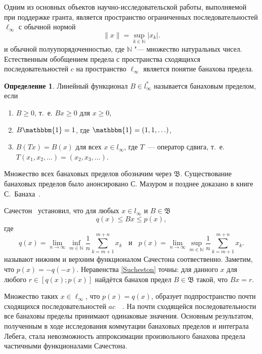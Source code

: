 \documentclass[a4paper,openbib]{report}
\renewcommand{\geq}{\geqslant} %
\theoremstyle{definition}
\newtheorem{definition}[lemma]{Определение}
\begin{document}

\setcounter{page}{2}

Одним из основных объектов научно-исследовательской работы, выполняемой при поддержке гранта,
является пространство ограниченных последовательностей $\ell_\infty$ с обычной нормой
\begin{equation*}
	\|x\| = \sup_{k\in\mathbb{N}} |x_k|
	.
\end{equation*}
и обычной полуупорядоченностью, где $\mathbb{N}$ "--- множество натуральных чисел.
Естественным обобщением предела с пространства сходящихся последовательностей $c$ на пространство $\ell_\infty$
является понятие банахова предела.


\begin{definition}
	Линейный функционал $B\in l_\infty^*$ называется банаховым пределом,
	если
	\begin{enumerate}
		\item
			$B\geq0$, т.~е. $Bx \geq 0$ для $x \geq 0$,
		\item
			$B\mathbbm{1}=1$, где $\mathbbm{1} =(1,1,\ldots)$,
		\item
			$B(Tx)=B(x)$ для всех $x\in l_\infty$, где $T$~---
		оператор сдвига, т.~е. $T(x_1,x_2,\ldots)=(x_2,x_3,\ldots)$.
	\end{enumerate}
\end{definition}
Множество всех банаховых пределов обозначим через $\mathfrak{B}$.
Существование банаховых пределов было анонсировано С. Мазуром \cite{Mazur} и позднее доказано в книге С.~Банаха~\cite{B}. 


Сачестон~\cite{sucheston1967banach} установил, что
для любых $x\in l_\infty$ и $B\in\mathfrak{B}$
\begin{equation}\label{Sucheston}
	q(x) \leqslant Bx \leqslant p(x)
	,
\end{equation}
где
\begin{equation*}
	q(x) = \lim_{n\to\infty} \inf_{m\in\mathbb{N}}  \frac{1}{n} \sum_{k=m+1}^{m+n} x_k
	~~~~\mbox{и}~~~~
	p(x) = \lim_{n\to\infty} \sup_{m\in\mathbb{N}}  \frac{1}{n} \sum_{k=m+1}^{m+n} x_k
	.
\end{equation*}
называют нижним и верхним функционалом Сачестона соотвественно.
Заметим, что $p(x) = -q(-x)$.
Неравенства \eqref{Sucheston} точны:
для данного $x$ для любого $r\in[q(x); p(x)]$ найдётся банахов предел
$B\in\mathfrak{B}$ такой, что $Bx = r$.

Множество таких $x\in\ell_\infty$, что $p(x)=q(x)$,
образует подпространство почти сходящихся последовательностей $ac$~~\cite{lorentz1948contribution}.
На почти сходящейся последовательности все банаховы пределы принимают одинаковые значения.
Основным результатом, полученным в ходе исследования коммутации банаховых пределов и интеграла Лебега,
стала невозможность аппроксимации произвольного банахова предела частичными функционалами Сачестона.
\end{document}
